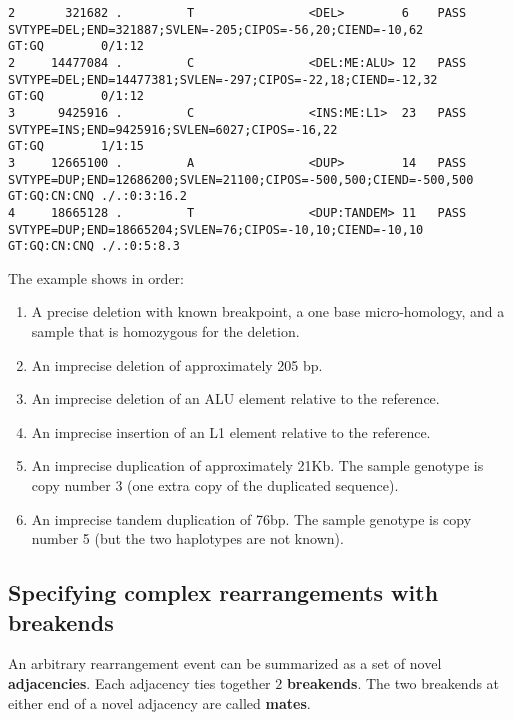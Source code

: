 \documentclass[8pt]{article}
\begin{document}
\begin{landscape}
\begin{verbatim}
2       321682 .         T                <DEL>        6    PASS   SVTYPE=DEL;END=321887;SVLEN=-205;CIPOS=-56,20;CIEND=-10,62         GT:GQ        0/1:12
2     14477084 .         C                <DEL:ME:ALU> 12   PASS   SVTYPE=DEL;END=14477381;SVLEN=-297;CIPOS=-22,18;CIEND=-12,32       GT:GQ        0/1:12
3      9425916 .         C                <INS:ME:L1>  23   PASS   SVTYPE=INS;END=9425916;SVLEN=6027;CIPOS=-16,22                     GT:GQ        1/1:15
3     12665100 .         A                <DUP>        14   PASS   SVTYPE=DUP;END=12686200;SVLEN=21100;CIPOS=-500,500;CIEND=-500,500  GT:GQ:CN:CNQ ./.:0:3:16.2
4     18665128 .         T                <DUP:TANDEM> 11   PASS   SVTYPE=DUP;END=18665204;SVLEN=76;CIPOS=-10,10;CIEND=-10,10         GT:GQ:CN:CNQ ./.:0:5:8.3
\end{verbatim}
\end{landscape}
\pagebreak
\normalsize

The example shows in order:
\begin{enumerate}
  \item A precise deletion with known breakpoint, a one base micro-homology, and a sample that is homozygous for the deletion.
  \item An imprecise deletion of approximately 205 bp.
  \item An imprecise deletion of an ALU element relative to the reference.
  \item An imprecise insertion of an L1 element relative to the reference.
  \item An imprecise duplication of approximately 21Kb. The sample genotype is copy number 3 (one extra copy of the duplicated sequence).
  \item An imprecise tandem duplication of 76bp. The sample genotype is copy number 5 (but the two haplotypes are not known).
\end{enumerate}

\subsection{Specifying complex rearrangements with breakends}

An arbitrary rearrangement event can be summarized as a set of novel \textbf{adjacencies}. Each adjacency ties together $2$ \textbf{breakends}. The two breakends at either end of a novel adjacency are called \textbf{mates}.
\end{document}
